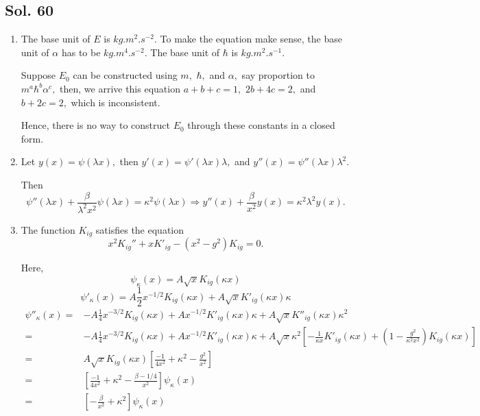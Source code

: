 \subsection*{Sol. 60}
\begin{enumerate}
    \item The base unit of $E$ is $\unit{kg.m^2.s^{-2}}.$ To make the equation make sense, the base unit of $\alpha$ has to be $\unit{kg.m^4.s^{-2}}.$ The base unit of $\hbar$ is $\unit{kg.m^2.s^{-1}}.$

    Suppose $E_0$ can be constructed using $m,$ $\hbar,$ and $\alpha,$ say proportion to $m^a\hbar^b\alpha^c,$ then, we arrive this equation
    $a+b+c=1,$ $2b+4c=2,$ and $b+2c=2,$ which is inconsistent.

    Hence, there is no way to construct $E_0$ through these constants in a closed form.

    \item 
    Let $y(x)=\psi(\lambda x),$ then $y'(x)=\psi'(\lambda x)\lambda,$ and $y''(x)=\psi''(\lambda x)\lambda^2.$

    Then 
    $$
    \psi''(\lambda x)+ \frac{\beta}{\lambda^2x^2}\psi(\lambda x) = \kappa^2\psi(\lambda x)
    \Rightarrow
    y''(x)+\frac{\beta}{x^2}y(x)=\kappa^2\lambda^2y(x).
    $$

    \item 
    The function $K_{ig}$ satisfies the equation
    $$
    x^2K_{ig}''+xK'_{ig}-(x^2-g^2)K_{ig}=0.
    $$

    Here, 
    $$
    \psi_\kappa(x)=A\sqrt{x}K_{ig}(\kappa x)
    $$
    $$
    \psi'_\kappa(x)=A\frac{1}{2}x^{-1/2}K_{ig}(\kappa x)
    +A\sqrt{x}K'_{ig}(\kappa x)\kappa
    $$
    \begin{align*}
        \psi''_\kappa(x)=&-A\frac{1}{4}x^{-3/2}K_{ig}(\kappa x)
    +Ax^{-1/2}K'_{ig}(\kappa x)\kappa
    +A\sqrt{x}K''_{ig}(\kappa x)\kappa^2\\
    =&
    -A\frac{1}{4}x^{-3/2}K_{ig}(\kappa x)
    +Ax^{-1/2}K'_{ig}(\kappa x)\kappa
    +A\sqrt{x} \kappa^2
    \left[
    -\frac{1}{\kappa x}
    K'_{ig}(\kappa x)
    +
    (1-\frac{g^2}{\kappa^2x^2})
    K_{ig}(\kappa x)
    \right]\\
    =&
    A\sqrt{x}K_{ig}(\kappa x)
    \left[
    \frac{-1}{4x^2}
    +\kappa^2
    -\frac{g^2}{x^2}
    \right]\\
    =&\left[
    \frac{-1}{4x^2}
    +\kappa^2
    -\frac{\beta-1/4}{x^2}
    \right]\psi_{\kappa}(x)\\
    =&\left[-\frac{\beta}{x^2}+\kappa^2\right]\psi_{\kappa}(x)
    \end{align*}



\end{enumerate}
